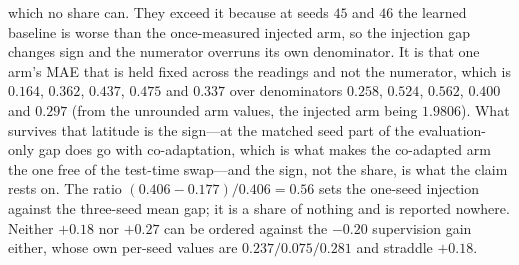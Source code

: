 which no share can. They exceed it because at seeds $45$ and $46$ the learned baseline is worse than
the once-measured injected arm, so the injection gap changes sign and the numerator overruns its own
denominator. It is that one arm's MAE that is held fixed across the readings and not the numerator,
which is $0.164$, $0.362$, $0.437$, $0.475$ and $0.337$ over
denominators $0.258$, $0.524$, $0.562$, $0.400$ and $0.297$ (from the unrounded arm values, the
injected arm being $1.9806$).
What survives that latitude is the sign---at the matched seed part of the
evaluation-only gap does go with co-adaptation, which is what makes the co-adapted arm the one free
of the test-time swap---and the sign, not the share, is what the claim rests on. The ratio
$(0.406-0.177)/0.406=0.56$ sets the one-seed injection against the three-seed mean gap; it is a
share of nothing and is reported nowhere. Neither $+0.18$ nor $+0.27$ can be ordered against the
$-0.20$ supervision gain either, whose own per-seed values are $0.237/0.075/0.281$ and straddle
$+0.18$.

